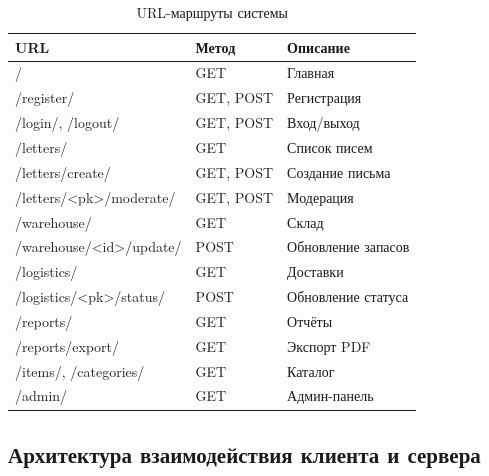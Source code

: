 \documentclass[14pt,a4paper]{extarticle}
\begin{document}
\begin{table}[H]
\centering
\caption{URL-маршруты системы}
\label{tab:urls}
\small
\begin{tabular}{|L{5cm}|C{1.5cm}|L{5.5cm}|}
\hline
\textbf{URL} & \textbf{Метод} & \textbf{Описание} \\
\hline
/ & GET & Главная \\
\hline
/register/ & GET, POST & Регистрация \\
\hline
/login/, /logout/ & GET, POST & Вход/выход \\
\hline
/letters/ & GET & Список писем \\
\hline
/letters/create/ & GET, POST & Создание письма \\
\hline
/letters/<pk>/moderate/ & GET, POST & Модерация \\
\hline
/warehouse/ & GET & Склад \\
\hline
/warehouse/<id>/update/ & POST & Обновление запасов \\
\hline
/logistics/ & GET & Доставки \\
\hline
/logistics/<pk>/status/ & POST & Обновление статуса \\
\hline
/reports/ & GET & Отчёты \\
\hline
/reports/export/ & GET & Экспорт PDF \\
\hline
/items/, /categories/ & GET & Каталог \\
\hline
/admin/ & GET & Админ-панель \\
\hline
\end{tabular}
\end{table}

\subsection{Архитектура взаимодействия клиента и сервера}
\end{document}
